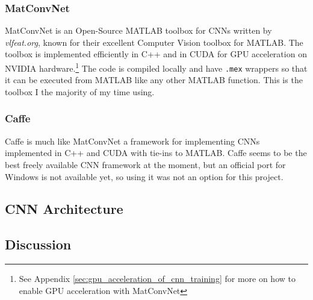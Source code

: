 \documentclass[Main]{subfiles}
\begin{document}
		\subsubsection{MatConvNet} %
			\label{ssub:matconvnet}
			MatConvNet \cite{Lenc2014} is an Open-Source MATLAB toolbox for CNNs written by \emph{vlfeat.org}, known for their excellent Computer Vision toolbox for MATLAB.
			The toolbox is implemented efficiently in C++ and in CUDA for GPU acceleration on NVIDIA hardware.\footnote{
				See Appendix \ref{sec:gpu_acceleration_of_cnn_training} for more on how to enable GPU acceleration with MatConvNet
				} 
			The code is compiled locally and have \texttt{.mex} wrappers so that it can be executed from MATLAB like any other MATLAB function.
			This is the toolbox I the majority of my time using.
		
		
		\subsubsection{Caffe} %
			\label{ssub:caffe}
			Caffe \cite{jia2014caffe} is much like MatConvNet a framework for implementing CNNs implemented in C++ and CUDA with tie-ins to MATLAB.
			Caffe seems to be the best freely available CNN framework at the moment, but an official port for Windows is not available yet, so using it was not an option for this project.



	\subsection{CNN Architecture} %
		\label{sub:cnn_architecture}
		


	\subsection{Discussion} %
		\label{sub:cnn_discussion}
		


	
\end{document}
